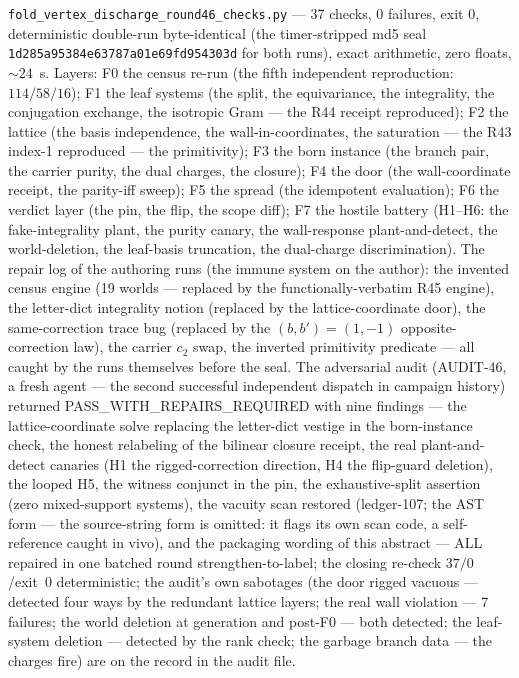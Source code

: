 \documentclass[11pt]{article}
\begin{document}
\texttt{fold\_vertex\_discharge\_round46\_checks.py} --- 37 checks, 0 failures, exit 0,
deterministic double-run byte-identical (the timer-stripped md5 seal
\texttt{1d285a95384e63787a01e69fd954303d} for both runs), exact arithmetic, zero floats,
$\sim 24$~s.  Layers: F0 the census re-run (the fifth independent reproduction:
$114/58/16$); F1 the leaf systems (the split, the equivariance, the integrality, the
conjugation exchange, the isotropic Gram --- the R44 receipt reproduced); F2 the lattice (the
basis independence, the wall-in-coordinates, the saturation --- the R43 index-1 reproduced ---
the primitivity); F3 the born instance (the branch pair, the carrier purity, the dual charges,
the closure); F4 the door (the wall-coordinate receipt, the parity-iff sweep); F5 the spread
(the idempotent evaluation); F6 the verdict layer (the pin, the flip, the scope diff); F7 the
hostile battery (H1--H6: the fake-integrality plant, the purity canary, the wall-response
plant-and-detect, the world-deletion, the leaf-basis truncation, the dual-charge
discrimination).  The repair log of the authoring runs (the immune system on the author): the
invented census engine (19 worlds --- replaced by the functionally-verbatim R45 engine), the
letter-dict integrality notion (replaced by the lattice-coordinate door), the same-correction
trace bug (replaced by the $(b,b') = (1,-1)$ opposite-correction law), the carrier $c_2$ swap,
the inverted primitivity predicate --- all caught by the runs themselves before the seal.  The
adversarial audit (AUDIT-46, a fresh agent --- the second successful independent dispatch in
campaign history) returned PASS\_WITH\_REPAIRS\_REQUIRED with nine findings --- the
lattice-coordinate solve replacing the letter-dict vestige in the born-instance check, the
honest relabeling of the bilinear closure receipt, the real plant-and-detect canaries (H1 the
rigged-correction direction, H4 the flip-guard deletion), the looped H5, the witness conjunct
in the pin, the exhaustive-split assertion (zero mixed-support systems), the vacuity scan
restored (ledger-107; the AST form --- the source-string form is omitted: it flags its own scan
code, a self-reference caught in vivo), and the packaging wording of this abstract --- ALL
repaired in one batched round strengthen-to-label; the closing re-check $37/0$/exit~0
deterministic; the audit's own sabotages (the door rigged vacuous --- detected four ways by the
redundant lattice layers; the real wall violation --- 7 failures; the world deletion at
generation and post-F0 --- both detected; the leaf-system deletion --- detected by the rank
check; the garbage branch data --- the charges fire) are on the record in the audit file.
\end{document}
